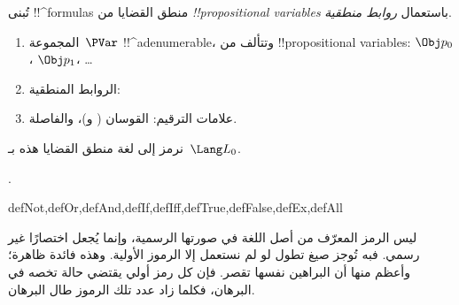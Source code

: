 \documentclass[../../../include/open-logic-section]{subfiles}
\begin{document}


تُبنى !!^{formula}s منطق القضايا من
\emph{!!{propositional
    variable}s} باستعمال \emph{روابط
  منطقية}.

\begin{enumerate}
\item المجموعة~$\PVar$ !!^a{denumerable}، وتتألف من
  !!{propositional variable}s: $\Obj p_0$، $\Obj p_1$، \dots
{}
\item الروابط المنطقية:
  \startycommalist
\item علامات الترقيم: القوسان ( و)، والفاصلة.
\end{enumerate}

نرمز إلى لغة منطق القضايا هذه بـ~$\Lang L_0$.

.

\begin{tagblock}{defNot,defOr,defAnd,defIf,defIff,defTrue,defFalse,defEx,defAll}
\begin{explain}
ليس الرمز المعرّف من أصل اللغة في صورتها الرسمية، وإنما يُجعل اختصارًا غير رسمي. فبه تُوجز صيغ تطول لو لم نستعمل إلا الرموز الأولية. وهذه فائدة ظاهرة؛ وأعظم منها أن البراهين نفسها تقصر. فإن كل رمز أولي يقتضي حالة تخصه في البرهان، فكلما زاد عدد تلك الرموز طال البرهان.
\end{explain}
\end{tagblock}

\end{document}
